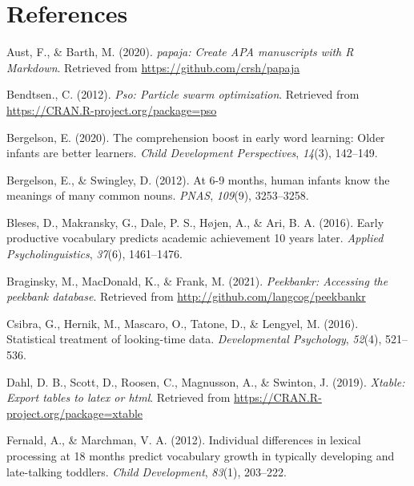 \documentclass[
  english,
  man,floatsintext]{apa6}
\begin{document}
\newpage

\hypertarget{references}{%
\section{References}\label{references}}

\begingroup
\setlength{\parindent}{-0.5in}
\setlength{\leftskip}{0.5in}

\hypertarget{refs}{}
\leavevmode\hypertarget{ref-R-papaja}{}%
Aust, F., \& Barth, M. (2020). \emph{papaja: Create APA manuscripts with R Markdown}. Retrieved from \url{https://github.com/crsh/papaja}

\leavevmode\hypertarget{ref-R-pso}{}%
Bendtsen., C. (2012). \emph{Pso: Particle swarm optimization}. Retrieved from \url{https://CRAN.R-project.org/package=pso}

\leavevmode\hypertarget{ref-bergelson2020comprehension}{}%
Bergelson, E. (2020). The comprehension boost in early word learning: Older infants are better learners. \emph{Child Development Perspectives}, \emph{14}(3), 142--149.

\leavevmode\hypertarget{ref-Bergelson2012a}{}%
Bergelson, E., \& Swingley, D. (2012). At 6-9 months, human infants know the meanings of many common nouns. \emph{PNAS}, \emph{109}(9), 3253--3258.

\leavevmode\hypertarget{ref-Bleses2016}{}%
Bleses, D., Makransky, G., Dale, P. S., Højen, A., \& Ari, B. A. (2016). Early productive vocabulary predicts academic achievement 10 years later. \emph{Applied Psycholinguistics}, \emph{37}(6), 1461--1476.

\leavevmode\hypertarget{ref-R-peekbankr}{}%
Braginsky, M., MacDonald, K., \& Frank, M. (2021). \emph{Peekbankr: Accessing the peekbank database}. Retrieved from \url{http://github.com/langcog/peekbankr}

\leavevmode\hypertarget{ref-Csibra2016}{}%
Csibra, G., Hernik, M., Mascaro, O., Tatone, D., \& Lengyel, M. (2016). Statistical treatment of looking-time data. \emph{Developmental Psychology}, \emph{52}(4), 521--536.

\leavevmode\hypertarget{ref-R-xtable}{}%
Dahl, D. B., Scott, D., Roosen, C., Magnusson, A., \& Swinton, J. (2019). \emph{Xtable: Export tables to latex or html}. Retrieved from \url{https://CRAN.R-project.org/package=xtable}

\leavevmode\hypertarget{ref-Fernald2012a}{}%
Fernald, A., \& Marchman, V. A. (2012). Individual differences in lexical processing at 18 months predict vocabulary growth in typically developing and late-talking toddlers. \emph{Child Development}, \emph{83}(1), 203--222.
\end{document}
